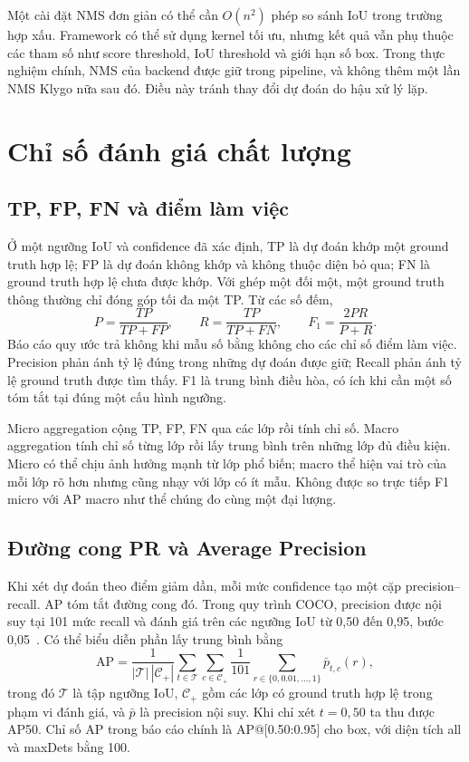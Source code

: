 Một cài đặt NMS đơn giản có thể cần $O(n^2)$ phép so sánh IoU trong trường hợp xấu. Framework có thể sử dụng kernel tối ưu, nhưng kết quả vẫn phụ thuộc các tham số như score threshold, IoU threshold và giới hạn số box. Trong thực nghiệm chính, NMS của backend được giữ trong pipeline, và không thêm một lần NMS Klygo nữa sau đó. Điều này tránh thay đổi dự đoán do hậu xử lý lặp.

\section{Chỉ số đánh giá chất lượng}
\subsection{TP, FP, FN và điểm làm việc}
Ở một ngưỡng IoU và confidence đã xác định, TP là dự đoán khớp một ground truth hợp lệ; FP là dự đoán không khớp và không thuộc diện bỏ qua; FN là ground truth hợp lệ chưa được khớp. Với ghép một đối một, một ground truth thông thường chỉ đóng góp tối đa một TP. Từ các số đếm,
\begin{equation}
P=\frac{TP}{TP+FP},\qquad R=\frac{TP}{TP+FN},\qquad
F_1=\frac{2PR}{P+R}.
\end{equation}
Báo cáo quy ước trả không khi mẫu số bằng không cho các chỉ số điểm làm việc. Precision phản ánh tỷ lệ đúng trong những dự đoán được giữ; Recall phản ánh tỷ lệ ground truth được tìm thấy. F1 là trung bình điều hòa, có ích khi cần một số tóm tắt tại đúng một cấu hình ngưỡng.

Micro aggregation cộng TP, FP, FN qua các lớp rồi tính chỉ số. Macro aggregation tính chỉ số từng lớp rồi lấy trung bình trên những lớp đủ điều kiện. Micro có thể chịu ảnh hưởng mạnh từ lớp phổ biến; macro thể hiện vai trò của mỗi lớp rõ hơn nhưng cũng nhạy với lớp có ít mẫu. Không được so trực tiếp F1 micro với AP macro như thể chúng đo cùng một đại lượng.

\subsection{Đường cong PR và Average Precision}
Khi xét dự đoán theo điểm giảm dần, mỗi mức confidence tạo một cặp precision--recall. AP tóm tắt đường cong đó. Trong quy trình COCO, precision được nội suy tại 101 mức recall và đánh giá trên các ngưỡng IoU từ 0,50 đến 0,95, bước 0,05~\cite{cocoeval}. Có thể biểu diễn phần lấy trung bình bằng
\begin{equation}
\mathrm{AP}=\frac{1}{|\mathcal{T}|\,|\mathcal{C}_{+}|}
\sum_{t\in\mathcal{T}}\sum_{c\in\mathcal{C}_{+}}
\frac{1}{101}\sum_{r\in\{0,0.01,\ldots,1\}}\bar{p}_{t,c}(r),
\end{equation}
trong đó $\mathcal{T}$ là tập ngưỡng IoU, $\mathcal{C}_{+}$ gồm các lớp có ground truth hợp lệ trong phạm vi đánh giá, và $\bar{p}$ là precision nội suy. Khi chỉ xét $t=0{,}50$ ta thu được AP50. Chỉ số AP trong báo cáo chính là AP@[0.50:0.95] cho box, với diện tích all và maxDets bằng 100.

